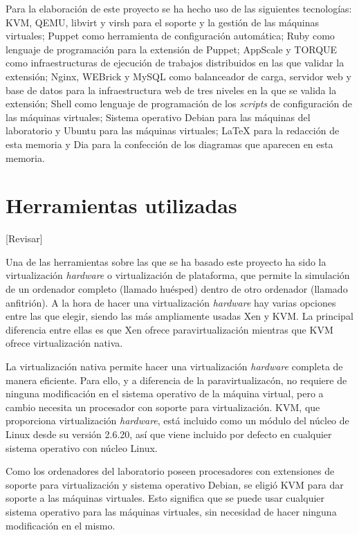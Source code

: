Para la elaboración de este proyecto se ha hecho uso de las siguientes tecnologías: KVM, QEMU, libvirt y virsh para el soporte y la gestión de las máquinas virtuales; Puppet como herramienta de configuración automática; Ruby como lenguaje de programación para la extensión de Puppet; AppScale y TORQUE como infraestructuras de ejecución de trabajos distribuidos en las que validar la extensión; Nginx, WEBrick y MySQL como balanceador de carga, servidor web y base de datos para la infraestructura web de tres niveles en la que se valida la extensión; Shell como lenguaje de programación de los \emph{scripts} de configuración de las máquinas virtuales; Sistema operativo Debian para las máquinas del laboratorio y Ubuntu para las máquinas virtuales; \LaTeX{} \cite{manual:latex} para la redacción de esta memoria y Dia para la confección de los diagramas que aparecen en esta memoria.


\section{Herramientas utilizadas}

[Revisar]

Una de las herramientas sobre las que se ha basado este proyecto ha sido la virtualización \emph{hardware} o virtualización de plataforma, que permite la simulación de un ordenador completo (llamado huésped) dentro de otro ordenador (llamado anfitrión). A la hora de hacer una virtualización \emph{hardware} hay varias opciones entre las que elegir, siendo las más ampliamente usadas Xen y KVM. La principal diferencia entre ellas es que Xen ofrece paravirtualización mientras que KVM ofrece virtualización nativa.

La virtualización nativa permite hacer una virtualización \emph{hardware} completa de manera eficiente. Para ello, y a diferencia de la paravirtualizacón, no requiere de ninguna modificación en el sistema operativo de la máquina virtual, pero a cambio necesita un procesador con soporte para virtualización. KVM, que proporciona virtualización \emph{hardware}, está incluido como un módulo del núcleo de Linux desde su versión 2.6.20, así que viene incluido por defecto en cualquier sistema operativo con núcleo Linux.

Como los ordenadores del laboratorio poseen procesadores con extensiones de soporte para virtualización y sistema operativo Debian, se eligió KVM para dar soporte a las máquinas virtuales. Esto significa que se puede usar cualquier sistema operativo para las máquinas virtuales, sin necesidad de hacer ninguna modificación en el mismo.

